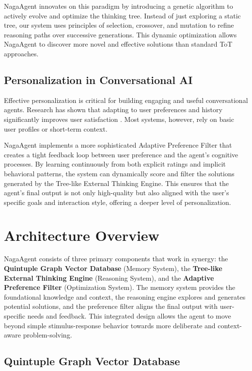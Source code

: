 \documentclass[letterpaper]{article} %
\begin{document}
NagaAgent innovates on this paradigm by introducing a genetic algorithm to actively evolve and optimize the thinking tree. Instead of just exploring a static tree, our system uses principles of selection, crossover, and mutation to refine reasoning paths over successive generations. This dynamic optimization allows NagaAgent to discover more novel and effective solutions than standard ToT approaches.

\subsection{Personalization in Conversational AI}
Effective personalization is critical for building engaging and useful conversational agents. Research has shown that adapting to user preferences and history significantly improves user satisfaction \cite{zhang2018personalizing, roller2021recipes}. Most systems, however, rely on basic user profiles or short-term context.

NagaAgent implements a more sophisticated Adaptive Preference Filter that creates a tight feedback loop between user preference and the agent's cognitive processes. By learning continuously from both explicit ratings and implicit behavioral patterns, the system can dynamically score and filter the solutions generated by the Tree-like External Thinking Engine. This ensures that the agent's final output is not only high-quality but also aligned with the user's specific goals and interaction style, offering a deeper level of personalization.

\section{Architecture Overview}

NagaAgent consists of three primary components that work in synergy: the {\bfseries Quintuple Graph Vector Database} (Memory System), the {\bfseries Tree-like External Thinking Engine} (Reasoning System), and the {\bfseries Adaptive Preference Filter} (Optimization System). The memory system provides the foundational knowledge and context, the reasoning engine explores and generates potential solutions, and the preference filter aligns the final output with user-specific needs and feedback. This integrated design allows the agent to move beyond simple stimulus-response behavior towards more deliberate and context-aware problem-solving.

\subsection{Quintuple Graph Vector Database}
\end{document}
